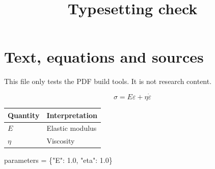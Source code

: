 \documentclass[
]{article}
\title{Typesetting check}
\author{}
\date{}
\newenvironment{Shaded}{}{}
\newcommand{\FloatTok}[1]{\textcolor[rgb]{0.25,0.63,0.44}{#1}}
\newcommand{\NormalTok}[1]{#1}
\newcommand{\OperatorTok}[1]{\textcolor[rgb]{0.40,0.40,0.40}{#1}}
\newcommand{\StringTok}[1]{\textcolor[rgb]{0.25,0.44,0.63}{#1}}
\begin{document}
\maketitle

\section{Text, equations and sources}\label{text-equations-and-sources}

This file only tests the PDF build tools. It is not research content.

\[\sigma=E\varepsilon+\eta\dot{\varepsilon}\]

\begin{longtable}[]{@{}ll@{}}
\toprule\noalign{}
Quantity & Interpretation \\
\midrule\noalign{}
\endhead
\bottomrule\noalign{}
\endlastfoot
\(E\) & Elastic modulus \\
\(\eta\) & Viscosity \\
\end{longtable}

\begin{Shaded}
\begin{Highlighting}[]
\NormalTok{parameters }\OperatorTok{=}\NormalTok{ \{}\StringTok{"E"}\NormalTok{: }\FloatTok{1.0}\NormalTok{, }\StringTok{"eta"}\NormalTok{: }\FloatTok{1.0}\NormalTok{\}}
\end{Highlighting}
\end{Shaded}
\end{document}

